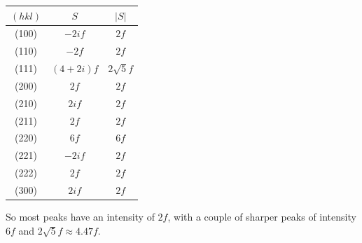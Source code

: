 \documentclass{article}
\begin{document}
\begin{center}
    \begin{tabular}{c|c|c}
        $(hkl)$ & $S$ & $|S|$ \\
        \hline
        (100) & $-2if$ & $2f$ \\
        (110) & $-2f$ & $2f$ \\
        (111) & $(4 + 2i)f$ & $2\sqrt{5}f$ \\
        (200) & $2f$ & $2f$ \\
        (210) & $2if$ & $2f$ \\
        (211) & $2f$ & $2f$ \\
        (220) & $6f$ & $6f$ \\
        (221) & $-2if$ & $2f$ \\
        (222) & $2f$ & $2f$ \\
        (300) & $2if$ & $2f$ \\
    \end{tabular}
\end{center}
So most peaks have an intensity of $2f$, with a couple of sharper peaks of intensity $6f$ and $2\sqrt{5}f \approx 4.47f$.
\end{document}
